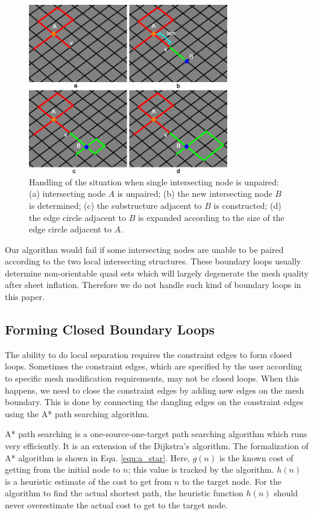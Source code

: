 \documentclass[final,5p,times,twocolumn]{elsarticle}
\begin{document}
\begin{figure}[htbp]
\begin{center}
\includegraphics[width=8.7cm]{create_int_node.png}
\caption{Handling of the situation when single intersecting node is unpaired: (a) intersecting node $A$ is unpaired; (b) the new intersecting node $B$ is determined; (c) the substructure adjacent to $B$ is constructed; (d) the edge circle adjacent to $B$ is expanded according to the size of the edge circle adjacent to $A$.}
\label{fig:create_int_node}
\end{center}
\end{figure}

Our algorithm would fail if some intersecting nodes are unable to be paired according to the two local intersecting structures. These boundary loops usually determine non-orientable quad sets\cite{Suzuki:2010hn} which will largely degenerate the mesh quality after sheet inflation. Therefore we do not handle such kind of boundary loops in this paper.

\subsection{Forming Closed Boundary Loops}
\label{sec:close_bound_loop}
The ability to do local separation requires the constraint edges to form closed loops. Sometimes the constraint edges, which are specified by the user according to specific mesh modification requirements, may not be closed loops. When this happens, we need to close the constraint edges by adding new edges on the mesh boundary. This is done by connecting the dangling edges on the constraint edges using the A* path searching algorithm\cite{hart1968formal}.

A* path searching is a one-source-one-target path searching algorithm which runs very efficiently. It is an extension of the Dijkstra's algorithm\cite{Dijkstra1959A}. The formalization of A* algorithm is shown in Equ. \ref{equ:a_star}. Here, $g(n)$ is the known cost of getting from the initial node to $n$; this value is tracked by the algorithm. $h(n)$ is a heuristic estimate of the cost to get from $n$ to the target node. For the algorithm to find the actual shortest path, the heuristic function $h(n)$ should never overestimate the actual cost to get to the target node.
\end{document}
